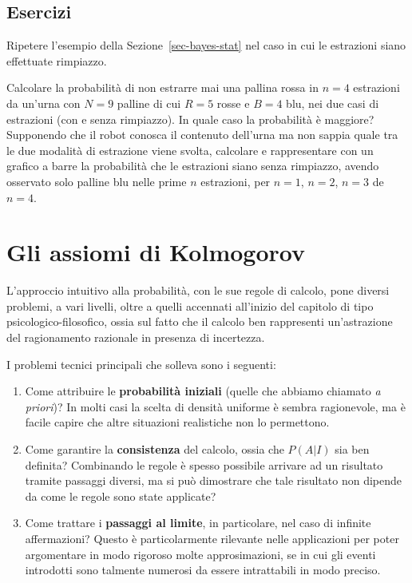 \documentclass[
  italian,
  letterpaper,
]{book}
\providecommand{\tightlist}{%
  \setlength{\itemsep}{0pt}\setlength{\parskip}{0pt}}
\theoremstyle{definition}
\theoremstyle{remark}
\begin{document}
\subsection{Esercizi}\label{esercizi-7}

Ripetere l'esempio della Sezione~\ref{sec-bayes-stat} nel caso in cui le
estrazioni siano effettuate rimpiazzo.

Calcolare la probabilità di non estrarre mai una pallina rossa in
\(n=4\) estrazioni da un'urna con \(N=9\) palline di cui \(R=5\) rosse e
\(B=4\) blu, nei due casi di estrazioni (con e senza rimpiazzo). In
quale caso la probabilità è maggiore? Supponendo che il robot conosca il
contenuto dell'urna ma non sappia quale tra le due modalità di
estrazione viene svolta, calcolare e rappresentare con un grafico a
barre la probabilità che le estrazioni siano senza rimpiazzo, avendo
osservato solo palline blu nelle prime \(n\) estrazioni, per \(n=1\),
\(n=2\), \(n=3\) de \(n=4\).

\section{Gli assiomi di Kolmogorov}\label{sec-assiomi}

L'approccio intuitivo alla probabilità, con le sue regole di calcolo,
pone diversi problemi, a vari livelli, oltre a quelli accennati
all'inizio del capitolo di tipo psicologico-filosofico, ossia sul fatto
che il calcolo ben rappresenti un'astrazione del ragionamento razionale
in presenza di incertezza.

I problemi tecnici principali che solleva sono i seguenti:

\begin{enumerate}
\def\labelenumi{\arabic{enumi}.}
\tightlist
\item
  Come attribuire le \textbf{probabilità iniziali} (quelle che abbiamo
  chiamato \emph{a priori})? In molti casi la scelta di densità uniforme
  è sembra ragionevole, ma è facile capire che altre situazioni
  realistiche non lo permettono.
\item
  Come garantire la \textbf{consistenza} del calcolo, ossia che
  \(P(A|I)\) sia ben definita? Combinando le regole è spesso possibile
  arrivare ad un risultato tramite passaggi diversi, ma si può
  dimostrare che tale risultato non dipende da come le regole sono state
  applicate?
\item
  Come trattare i \textbf{passaggi al limite}, in particolare, nel caso
  di infinite affermazioni? Questo è particolarmente rilevante nelle
  applicazioni per poter argomentare in modo rigoroso molte
  approsimazioni, se in cui gli eventi introdotti sono talmente numerosi
  da essere intrattabili in modo preciso.
\end{enumerate}
\end{document}
